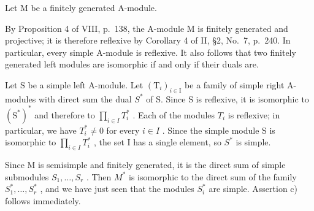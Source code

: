 Let \(\mathrm{M}\) be a finitely generated A-module.

By Proposition 4 of VIII, p.~138, the A-module M is finitely generated and projective; it is therefore reflexive by Corollary 4 of II, §2, No.~7, p.~240. In particular, every simple A-module is reflexive. It also follows that two finitely generated left modules are isomorphic if and only if their duals are.

Let S be a simple left A-module. Let \((\mathrm{T}_{i})_{i\in\mathrm{I}}\) be a family of simple right A-modules with direct sum the dual \(S^{*}\) of S. Since S is reflexive, it is isomorphic to \((\mathrm{S}^{*})^{*}\) and therefore to \(\prod_{i\in I}T_{i}^{*}\) . Each of the modules \(T_{i}\) is reflexive; in particular, we have \(T_{i}^{*}\neq0\) for every \(i\in I\) . Since the simple module S is isomorphic to \(\prod_{i\in I}T_{i}^{*}\) , the set I has a single element, so \(S^{*}\) is simple.

Since M is semisimple and finitely generated, it is the direct sum of simple submodules \(S_{1},\ldots,S_{r}\) . Then \(M^{*}\) is isomorphic to the direct sum of the family \(S_{1}^{*},\ldots,S_{r}^{*}\) , and we have just seen that the modules \(S_{i}^{*}\) are simple. Assertion c) follows immediately.

